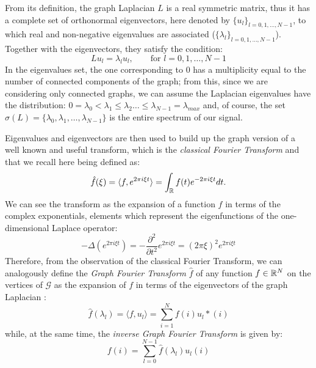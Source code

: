 From its definition, the graph Laplacian $L$ is a real symmetric matrix, thus it has a complete set of orthonormal eigenvectors, here denoted by $\{u_l\}_{l=0,1,\dots,N-1}$, to which real and non-negative eigenvalues are associated ($\{\lambda_l\}_{l=0,1,\dots,N-1}$). Together with the eigenvectors, they satisfy the condition:
\begin{equation}
L u_l = \lambda_l u_l, \qquad \text{for  } l = 0,1,\dots,N-1
\end{equation}
In the eigenvalues set, the one corresponding to $0$ has a multiplicity equal to the number of connected components of the graph; from this, since we are considering only connected graphs, we can assume the Laplacian eigenvalues have the distribution: $0 = \lambda_0 < \lambda_1 \leq \lambda_2 \dots \leq \lambda_{N-1} = \lambda_{max}$ and, of course, the set $\sigma(L) = \{\lambda_0, \lambda_1,\dots,\lambda_{N-1}\}$ is the entire spectrum of our signal.

Eigenvalues and eigenvectors are then used to build up the graph version of a well known and useful transform, which is the \textit{classical Fourier Transform} and that we recall here being defined as:
\begin{equation}
\hat{f}(\xi) = \langle f, e^{2\pi i \xi t}\rangle = \int_{\mathbb{R}} f(t)e^{-2\pi i \xi t} dt.
\end{equation}
We can see the transform as the expansion of a function $f$ in terms of the complex exponentials, elements which represent the eigenfunctions of the one-dimensional Laplace operator:
\begin{equation}
-\Delta(e^{2\pi i \xi t}) = -\frac{\partial^2}{\partial t^2}e^{2\pi i \xi t} = (2\pi\xi)^2e^{2\pi i \xi t}
\end{equation}
Therefore, from the observation of the classical Fourier Transform, we can analogously define the \textit{Graph Fourier Transform} $\hat{f}$ of any function $f \in \mathbb{R}^N$ on the vertices of $\mathcal{G}$ as the expansion of $f$ in terms of the eigenvectors of the graph Laplacian \cite{Shuman2013}:
\begin{equation}
\hat{f}(\lambda_l) = \langle f, u_l \rangle = \sum^{N}_{i=1}f(i)u_l*(i)
\end{equation}
while, at the same time, the \textit{inverse Graph Fourier Transform} is given by:
\begin{equation}
f(i) = \sum^{N-1}_{l = 0}\hat{f}(\lambda_l)u_l(i)
\end{equation}

